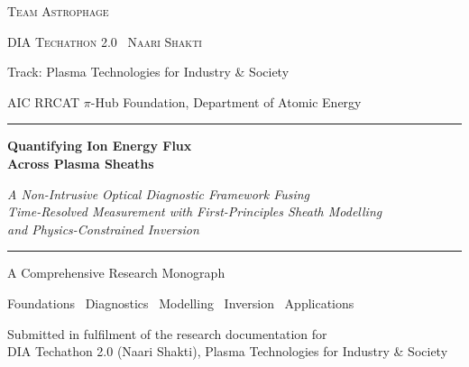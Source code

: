 \begin{titlepage}
\centering
\singlespacing
\vspace*{0.5cm}

{\scshape\large Team Astrophage \par}
{\scshape DIA Techathon 2.0 \textbullet\ Naari Shakti \par}
\vspace{0.25cm}
{\small Track: Plasma Technologies for Industry \& Society \par}
{\small AIC RRCAT $\pi$-Hub Foundation, Department of Atomic Energy \par}

\vspace{1.0cm}
\rule{\textwidth}{0.8pt}\par
\vspace{0.55cm}
{\huge\bfseries Quantifying Ion Energy Flux \\[0.25cm] Across Plasma Sheaths \par}
\vspace{0.5cm}
{\large\itshape A Non-Intrusive Optical Diagnostic Framework Fusing \\ Time-Resolved Measurement with First-Principles Sheath Modelling \\ and Physics-Constrained Inversion \par}
\vspace{0.5cm}
\rule{\textwidth}{0.8pt}\par

\vspace{0.9cm}
{\large A Comprehensive Research Monograph \par}
\vspace{0.15cm}
{\normalsize Foundations \textbullet\ Diagnostics \textbullet\ Modelling \textbullet\ Inversion \textbullet\ Applications \par}

\vfill

{\small Submitted in fulfilment of the research documentation for \\ DIA Techathon 2.0 (Naari Shakti), Plasma Technologies for Industry \& Society \par}
\vspace{0.4cm}

\end{titlepage}
